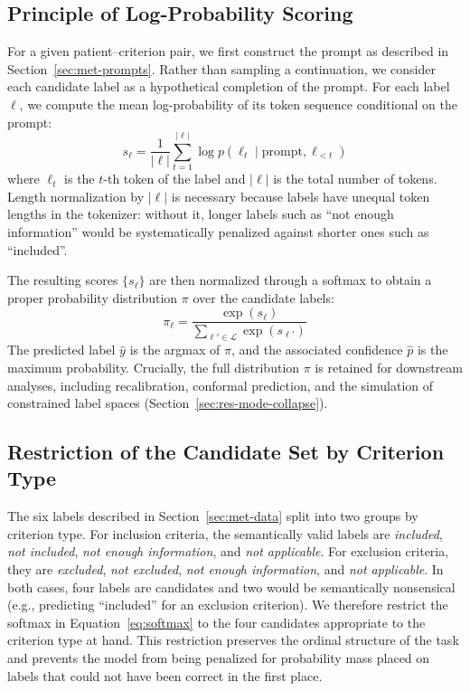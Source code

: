 \subsection{Principle of Log-Probability Scoring}
\label{subsec:met-scoring-principle}

For a given patient--criterion pair, we first construct the prompt as 
described in Section~\ref{sec:met-prompts}. Rather than sampling a 
continuation, we consider each candidate label as a hypothetical completion 
of the prompt. For each label $\ell$, we compute the mean log-probability 
of its token sequence conditional on the prompt:
\begin{equation}
    s_\ell = \frac{1}{|\ell|} \sum_{t=1}^{|\ell|} \log p(\ell_t \mid \text{prompt}, \ell_{<t})
    \label{eq:label-logprob}
\end{equation}
where $\ell_t$ is the $t$-th token of the label and $|\ell|$ is the total 
number of tokens. Length normalization by $|\ell|$ is necessary because 
labels have unequal token lengths in the tokenizer: without it, longer 
labels such as ``not enough information'' would be systematically 
penalized against shorter ones such as ``included''.

The resulting scores $\{s_\ell\}$ are then normalized through a softmax to 
obtain a proper probability distribution $\pi$ over the candidate labels:
\begin{equation}
    \pi_\ell = \frac{\exp(s_\ell)}{\sum_{\ell' \in \mathcal{L}} \exp(s_{\ell'})}
    \label{eq:softmax}
\end{equation}
The predicted label $\hat{y}$ is the argmax of $\pi$, and the associated 
confidence $\hat{p}$ is the maximum probability. Crucially, the full 
distribution $\pi$ is retained for downstream analyses, including 
recalibration, conformal prediction, and the simulation of constrained 
label spaces (Section~\ref{sec:res-mode-collapse}).

\subsection{Restriction of the Candidate Set by Criterion Type}
\label{subsec:met-scoring-candidates}

The six labels described in Section~\ref{sec:met-data} split into two 
groups by criterion type. For inclusion criteria, the semantically valid 
labels are \emph{included}, \emph{not included}, \emph{not enough 
information}, and \emph{not applicable}. For exclusion criteria, they are 
\emph{excluded}, \emph{not excluded}, \emph{not enough information}, and 
\emph{not applicable}. In both cases, four labels are candidates and two 
would be semantically nonsensical (e.g., predicting ``included'' for an 
exclusion criterion). We therefore restrict the softmax in 
Equation~\ref{eq:softmax} to the four candidates appropriate to the 
criterion type at hand. This restriction preserves the ordinal structure 
of the task and prevents the model from being penalized for probability 
mass placed on labels that could not have been correct in the first place.

